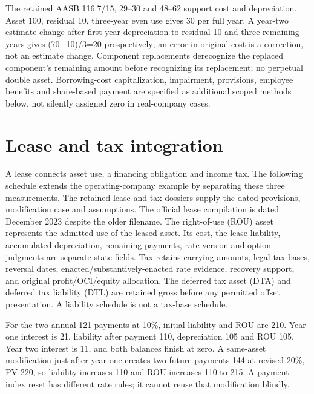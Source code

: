 The retained AASB 116.7/15, 29--30 and 48--62 support cost and depreciation. Asset 100, residual 10, three-year even use gives 30 per full year. A year-two estimate change after first-year depreciation to residual 10 and three remaining years gives (70\ensuremath{-}10)/3=20 prospectively; an error in original cost is a correction, not an estimate change. Component replacements derecognize the replaced component's remaining amount before recognizing its replacement; no perpetual double asset. Borrowing-cost capitalization, impairment, provisions, employee benefits and share-based payment are specified as additional scoped methods below, not silently assigned zero in real-company cases.









\hypertarget{lease-and-tax-integration}{%
\section{Lease and tax integration}\label{method-corporate-methods-lease-and-tax-integration}}

A lease connects asset use, a financing obligation and income tax. The following schedule extends the operating-company example by separating these three measurements. The retained lease and tax dossiers supply the dated provisions, modification case and assumptions. The official lease compilation is dated December 2023 despite the older filename. The right-of-use (ROU) asset represents the admitted use of the leased asset. Its cost, the lease liability, accumulated depreciation, remaining payments, rate version and option judgments are separate state fields. Tax retains carrying amounts, legal tax bases, reversal dates, enacted/substantively-enacted rate evidence, recovery support, and original profit/OCI/equity allocation. The deferred tax asset (DTA) and deferred tax liability (DTL) are retained gross before any permitted offset presentation. A liability schedule is not a tax-base schedule.

For the two annual 121 payments at 10\%, initial liability and ROU are 210. Year-one interest is 21, liability after payment 110, depreciation 105 and ROU 105. Year two interest is 11, and both balances finish at zero. A same-asset modification just after year one creates two future payments 144 at revised 20\%, PV 220, so liability increases 110 and ROU increases 110 to 215. A payment index reset has different rate rules; it cannot reuse that modification blindly.

